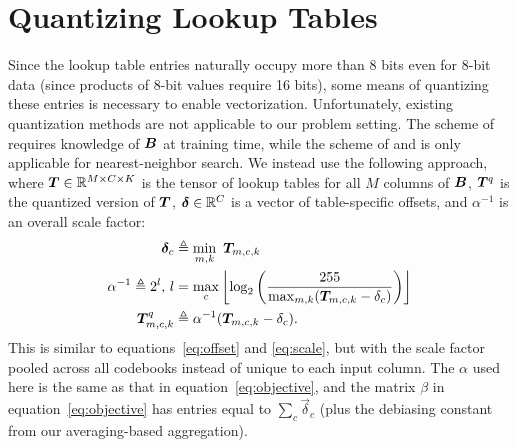 
\section{Quantizing Lookup Tables} \label{sec:lutQuantize}


Since the lookup table entries naturally occupy more than 8 bits even for 8-bit data (since products of 8-bit values require 16 bits), some means of quantizing these entries is necessary to enable vectorization. Unfortunately, existing quantization methods are not applicable to our problem setting. The scheme of \citet{bolt} requires knowledge of $\bm{B}$ at training time, while the scheme of \citet{quickAdc} and \citet{quickerAdc} is only applicable for nearest-neighbor search. We instead use the following approach, where $\bm{T} \in \mathbb{R}^{M \times C \times K}$ is the tensor of lookup tables for all $M$ columns of $\bm{B}$, $\bm{T}^q$ is the quantized version of $\bm{T}$, $\bm{\delta} \in \mathbb{R}^C$ is a vector of table-specific offsets, and $\alpha^{-1}$ is an overall scale factor:
\begin{align}
    \bm{\delta}_c &\triangleq \min_{m,k} \text{ } \bm{T}_{m,c,k} \\
    \alpha^{-1} \triangleq 2^l \text{, } l &= \max_c \left \lfloor  \log_2 \left( \frac{255}{
            \max_{m,k} (\bm{T}_{m,c,k} - \delta_{c})
        } \right) \right \rfloor \\
    \bm{T}^q_{m,c,k} &\triangleq \alpha^{-1}(\bm{T}_{m,c,k} - \delta_{c}).
\end{align}
This is similar to equations~\ref{eq:offset} and \ref{eq:scale}, but with the scale factor pooled across all codebooks instead of unique to each input column. The $\alpha$ used here is the same as that in equation~\ref{eq:objective}, and the matrix $\beta$ in equation~\ref{eq:objective} has entries equal to $\sum_c \vec{\delta}_c$ (plus the debiasing constant from our averaging-based aggregation).

